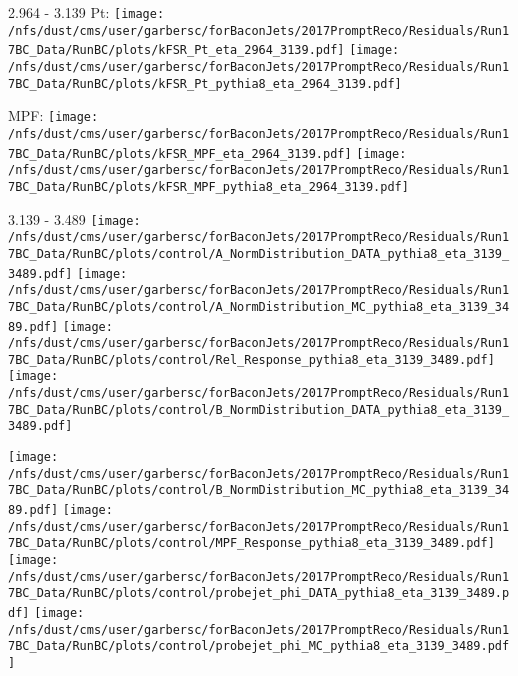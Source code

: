 \documentclass[t,compress]{beamer}
\begin{document}
\begin{frame}{2.964 - 3.139}
	 Pt: \texttt{[image: /nfs/dust/cms/user/garbersc/forBaconJets/2017PromptReco/Residuals/Run17BC\_Data/RunBC/plots/kFSR\_Pt\_eta\_2964\_3139.pdf]}
	\texttt{[image: /nfs/dust/cms/user/garbersc/forBaconJets/2017PromptReco/Residuals/Run17BC\_Data/RunBC/plots/kFSR\_Pt\_pythia8\_eta\_2964\_3139.pdf]}
\newline

	 MPF: \texttt{[image: /nfs/dust/cms/user/garbersc/forBaconJets/2017PromptReco/Residuals/Run17BC\_Data/RunBC/plots/kFSR\_MPF\_eta\_2964\_3139.pdf]}
	\texttt{[image: /nfs/dust/cms/user/garbersc/forBaconJets/2017PromptReco/Residuals/Run17BC\_Data/RunBC/plots/kFSR\_MPF\_pythia8\_eta\_2964\_3139.pdf]}
\end{frame}

\begin{frame}{3.139 - 3.489}
	\texttt{[image: /nfs/dust/cms/user/garbersc/forBaconJets/2017PromptReco/Residuals/Run17BC\_Data/RunBC/plots/control/A\_NormDistribution\_DATA\_pythia8\_eta\_3139\_3489.pdf]}
	\texttt{[image: /nfs/dust/cms/user/garbersc/forBaconJets/2017PromptReco/Residuals/Run17BC\_Data/RunBC/plots/control/A\_NormDistribution\_MC\_pythia8\_eta\_3139\_3489.pdf]}
	\texttt{[image: /nfs/dust/cms/user/garbersc/forBaconJets/2017PromptReco/Residuals/Run17BC\_Data/RunBC/plots/control/Rel\_Response\_pythia8\_eta\_3139\_3489.pdf]}
	\texttt{[image: /nfs/dust/cms/user/garbersc/forBaconJets/2017PromptReco/Residuals/Run17BC\_Data/RunBC/plots/control/B\_NormDistribution\_DATA\_pythia8\_eta\_3139\_3489.pdf]}
\newline

	\texttt{[image: /nfs/dust/cms/user/garbersc/forBaconJets/2017PromptReco/Residuals/Run17BC\_Data/RunBC/plots/control/B\_NormDistribution\_MC\_pythia8\_eta\_3139\_3489.pdf]}
	\texttt{[image: /nfs/dust/cms/user/garbersc/forBaconJets/2017PromptReco/Residuals/Run17BC\_Data/RunBC/plots/control/MPF\_Response\_pythia8\_eta\_3139\_3489.pdf]}
	\texttt{[image: /nfs/dust/cms/user/garbersc/forBaconJets/2017PromptReco/Residuals/Run17BC\_Data/RunBC/plots/control/probejet\_phi\_DATA\_pythia8\_eta\_3139\_3489.pdf]}
	\texttt{[image: /nfs/dust/cms/user/garbersc/forBaconJets/2017PromptReco/Residuals/Run17BC\_Data/RunBC/plots/control/probejet\_phi\_MC\_pythia8\_eta\_3139\_3489.pdf]}
\end{frame}
\end{document}

